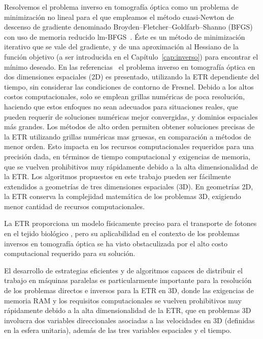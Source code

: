  Resolvemos el problema inverso en tomografía óptica como un problema 
 de minimización no lineal para el que empleamos
 el método cuasi-Newton de descenso de gradiente denominado 
 Broyden–Fletcher–Goldfarb–Shanno (BFGS) con uso de memoria reducido lm-BFGS~\cite{Byrd1995}. Éste es un método de minimización iterativo 
 que se vale del gradiente, y de una aproximación 
 al Hessiano de la función objetivo (a ser 
 introducida en el Capítulo~\ref{cap:inverso}) para encontrar el mínimo deseado. En las referencias~\cite{Prieto2017,Boulanger2005} 
 el problema inverso en tomografía óptica en dos dimensiones espaciales (2D)
es presentado, utilizando la ETR dependiente del tiempo, sin considerar las condiciones de contorno de Fresnel. Debido a los altos costos computacionales,
 solo se emplean grillas numéricas de poca resolución,
 haciendo que estos enfoques no sean adecuados para situaciones reales, que pueden requerir
 de soluciones numéricas mejor convergidas, y dominios espaciales más grandes. 
 Los métodos de alto orden
 permiten obtener soluciones precisas de la ETR
 utilizando grillas numéricas mas gruesas, en comparación a métodos de menor orden. Esto impacta en los recursos computacionales requeridos para una precisión dada, en términos de tiempo computacional y exigencias de memoria, que se vuelven prohibitivos muy rápidamente debido a la alta dimensionalidad de la ETR. Los algoritmos propuestos 
 en este trabajo pueden ser fácilmente extendidos a geometrías de tres dimensiones espaciales (3D). En geometrías 2D, la ETR
 conserva la complejidad matemática de los problemas 3D, 
 exigiendo menor cantidad de recursos computacionales. 

La ETR proporciona un
modelo físicamente preciso para el transporte de fotones en el tejido biológico
\cite{Klose2009, Arridge2009}, pero su aplicabilidad en el contexto de
los problemas inversos en tomografía óptica se ha visto obstaculizada por el alto costo computacional requerido para su solución. 

El desarrollo de estrategias eficientes y de algoritmos capaces de distribuir el trabajo en máquinas paralelas es particularmente importante para la
resolución de los problemas directos e inversos para la ETR en 3D, donde las exigencias 
de memoria RAM y
los requisitos computacionales se vuelven prohibitivos muy rápidamente
debido a la alta dimensionalidad de la ETR, que en problemas 3D
involucra dos variables direccionales asociadas a las velocidades en 3D (definidas 
en la esfera unitaria), además de las tres variables espaciales y el tiempo. 


